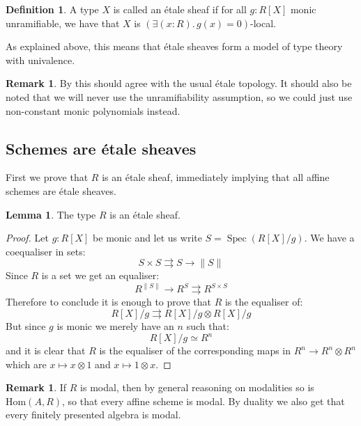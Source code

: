 \documentclass[10pt,a4paper]{article}
\theoremstyle{definition}
\newtheorem{lemma}[theorem]{Lemma}
\newtheorem{definition}[theorem]{Definition}
\newtheorem{remark}[theorem]{Remark}
\DeclareMathOperator{\Spec}{Spec}
\newcommand{\propTrunc}[1]{\lVert #1 \rVert}
\begin{document}
\begin{definition}
A type $X$ is called an \'etale sheaf if for all $g:R[X]$ monic unramifiable, we have that $X$ is $(\exists(x:R).\, g(x)=0)$-local.
\end{definition}

As explained above, this means that étale sheaves form a model of type theory with univalence.


\begin{remark}
  By \cite{wraith79} this should agree with the usual \'etale topology.
  It should also be noted that we will never use the unramifiability assumption, so we could just use non-constant monic polynomials instead.
\end{remark}


\subsection{Schemes are \'etale sheaves}



First we prove that $R$ is an étale sheaf, immediately implying that all affine schemes are étale sheaves.

\begin{lemma}\label{etale-subcanonical}
The type $R$ is an \'etale sheaf.
\end{lemma}

\begin{proof}
Let $g:R[X]$ be monic and let us write $S=\Spec(R[X]/g)$. We have a coequaliser in sets:
\[S\times S\rightrightarrows S \to \propTrunc{S}\]
Since $R$ is a set we get an equaliser:
\[R^{\propTrunc{S}} \to R^S\rightrightarrows R^{S\times S}\]
Therefore to conclude it is enough to prove that $R$ is the equaliser of:
\[R[X]/g \rightrightarrows R[X]/g \otimes R[X]/g\]
But since $g$ is monic we merely have an $n$ such that:
\[R[X]/g \simeq R^n\]
and it is clear that $R$ is the equaliser of the corresponding maps in $R^n \to R^n\otimes R^n$ which are $x\mapsto x\otimes 1$ and $x\mapsto 1\otimes x$.
\end{proof}

\begin{remark}\label{R-modal-subcanonical}
If $R$ is modal, then by general reasoning on modalities so is $\mathrm{Hom}(A,R)$, so that every affine scheme is modal. By duality we also get that every finitely presented algebra is modal.
\end{remark}
\end{document}
